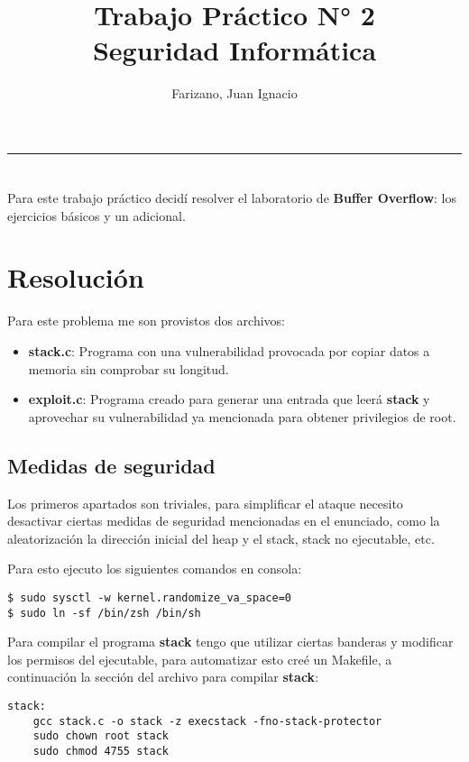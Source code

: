 \documentclass[11pt]{article}
\title{
    Trabajo Práctico  N° 2 \\
    \large Seguridad Informática}
\author{Farizano, Juan Ignacio}
\date{}
\begin{document}
\maketitle
\rule{\textwidth}{1pt}

\section*{}
Para este trabajo práctico decidí resolver el laboratorio de \textbf{Buffer Overflow}: los
ejercicios básicos y un adicional.

\section*{Resolución}

Para este problema me son provistos dos archivos:

\begin{itemize}
    \item \textbf{stack.c}: Programa con una vulnerabilidad provocada por copiar
    datos a memoria sin comprobar su longitud.
    \item \textbf{exploit.c}: Programa creado para generar una entrada que leerá
    \textbf{stack} y aprovechar su vulnerabilidad ya mencionada para obtener
    privilegios de root.
\end{itemize}

\subsection*{Medidas de seguridad}

Los primeros apartados son triviales, para simplificar el ataque necesito
desactivar ciertas medidas de seguridad mencionadas en el enunciado, como la
aleatorización la dirección inicial del heap y el stack, stack no ejecutable, etc.

Para esto ejecuto los siguientes comandos en consola:
\begin{verbatim}
$ sudo sysctl -w kernel.randomize_va_space=0
$ sudo ln -sf /bin/zsh /bin/sh
\end{verbatim}

Para compilar el programa \textbf{stack} tengo que utilizar ciertas banderas y modificar
los permisos del ejecutable, para automatizar esto creé un Makefile,
a continuación la sección del archivo para compilar \textbf{stack}:
\begin{verbatim}
stack:
    gcc stack.c -o stack -z execstack -fno-stack-protector
    sudo chown root stack
    sudo chmod 4755 stack
\end{verbatim}
\end{document}
